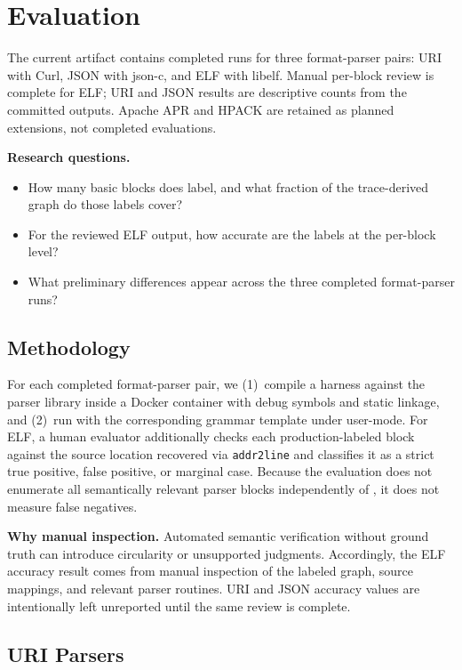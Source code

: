 \section{Evaluation}\label{sec:evaluation}

The current artifact contains completed runs for three format-parser pairs: URI with Curl, JSON with json-c, and ELF with libelf.
Manual per-block review is complete for ELF; URI and JSON results are descriptive counts from the committed outputs.
Apache APR and HPACK are retained as planned extensions, not completed evaluations.

\textbf{Research questions.}
\begin{itemize}
    \item[\textbf{(Q1)}] How many basic blocks does \toolname label, and what fraction of the trace-derived graph do those labels cover?
    \item[\textbf{(Q2)}] For the reviewed ELF output, how accurate are the labels at the per-block level?
    \item[\textbf{(Q3)}] What preliminary differences appear across the three completed format-parser runs?
\end{itemize}

\subsection{Methodology}\label{sec:eval:method}

For each completed format-parser pair, we (1)~compile a harness against the parser library inside a Docker container with debug symbols and static linkage, and (2)~run \toolname with the corresponding grammar template under \QEMU user-mode.
For ELF, a human evaluator additionally checks each production-labeled block against the source location recovered via \texttt{addr2line} and classifies it as a strict true positive, false positive, or marginal case.
Because the evaluation does not enumerate all semantically relevant parser blocks independently of \toolname, it does not measure false negatives.

\textbf{Why manual inspection.}
Automated semantic verification without ground truth can introduce circularity or unsupported judgments.
Accordingly, the ELF accuracy result comes from manual inspection of the labeled graph, source mappings, and relevant parser routines.
URI and JSON accuracy values are intentionally left unreported until the same review is complete.

\subsection{URI Parsers}\label{sec:eval:url}

